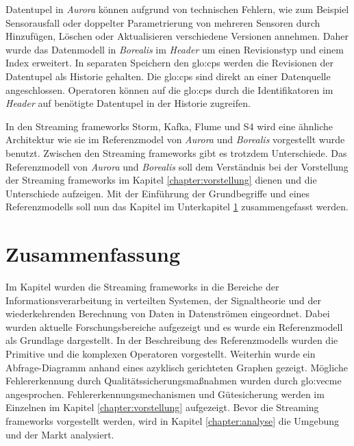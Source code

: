 Datentupel in \textit{Aurora} können aufgrund von technischen Fehlern, wie zum Beispiel Sensorausfall oder doppelter Parametrierung von mehreren Sensoren durch Hinzufügen, Löschen oder Aktualisieren verschiedene Versionen annehmen. Daher wurde das Datenmodell in \textit{Borealis} im \textit{Header} um einen Revisionstyp und einem Index erweitert. In separaten Speichern den \glspl{glo:cp} werden die Revisionen der Datentupel als Historie gehalten. Die \glspl{glo:cp} sind direkt an einer Datenquelle angeschlossen. Operatoren können auf die \glspl{glo:cp} durch die Identifikatoren im \textit{Header} auf benötigte Datentupel in der Historie zugreifen.

In den Streaming frameworks Storm, Kafka, Flume und S4 wird eine ähnliche Architektur wie sie im Referenzmodel von \textit{Aurora} und \textit{Borealis} vorgestellt wurde benutzt. Zwischen den Streaming frameworks gibt es trotzdem Unterschiede. Das Referenzmodell von \textit{Aurora} und \textit{Borealis} soll dem Verständnis bei der Vorstellung der Streaming frameworks im Kapitel \ref{chapter:vorstellung} dienen und die Unterschiede aufzeigen. Mit der Einführung der Grundbegriffe und eines Referenzmodells soll nun das Kapitel  im Unterkapitel \ref{section:zusammenfassung} zusammengefasst werden.

\section{Zusammenfassung}
\label{section:zusammenfassung}

Im Kapitel  wurden die Streaming frameworks in die Bereiche der Informationsverarbeitung in verteilten Systemen, der Signaltheorie und der wiederkehrenden Berechnung von Daten in Datenströmen eingeordnet. Dabei wurden aktuelle Forschungsbereiche aufgezeigt und es wurde ein Referenzmodell als Grundlage dargestellt. In der Beschreibung des Referenzmodells wurden die Primitive und die komplexen Operatoren vorgestellt. Weiterhin wurde ein Abfrage-Diagramm anhand eines azyklisch gerichteten Graphen gezeigt. Mögliche Fehlererkennung durch Qualitätssicherungsmaßnahmen wurden durch \acrlong{glo:vecme} angesprochen. Fehlererkennungsmechanismen und Gütesicherung werden im Einzelnen im Kapitel \ref{chapter:vorstellung} aufgezeigt. Bevor die Streaming frameworks vorgestellt werden, wird in Kapitel \ref{chapter:analyse} die Umgebung und der Markt analysiert.